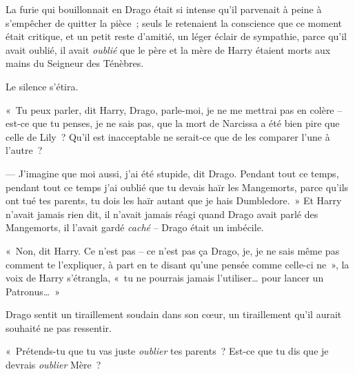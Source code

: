 \later

La furie qui bouillonnait en Drago était si intense qu'il parvenait à peine à s'empêcher de quitter la pièce~; seuls le retenaient la conscience que ce moment était critique, et un petit reste d'amitié, un léger éclair de sympathie, parce qu'il avait oublié, il avait \emph{oublié} que le père et la mère de Harry étaient morts aux mains du Seigneur des Ténèbres.

Le silence s'étira.

«~Tu peux parler, dit Harry, Drago, parle-moi, je ne me mettrai pas en colère -- est-ce que tu penses, je ne sais pas, que la mort de Narcissa a été bien pire que celle de Lily~? Qu'il est inacceptable ne serait-ce que de les comparer l'une à l'autre~?

--- J'imagine que moi aussi, j'ai été stupide, dit Drago. Pendant tout ce temps, pendant tout ce temps j'ai oublié que tu devais haïr les Mangemorts, parce qu'ils ont tué tes parents, tu dois les haïr autant que je hais Dumbledore.~» Et Harry n'avait jamais rien dit, il n'avait jamais réagi quand Drago avait parlé des Mangemorts, il l'avait gardé \emph{caché} -- Drago était un imbécile.

«~Non, dit Harry. Ce n'est pas -- ce n'est pas ça Drago, je, je ne sais même pas comment te l'expliquer, à part en te disant qu'une pensée comme celle-ci ne~», la voix de Harry s'étrangla, «~tu ne pourrais jamais l'utiliser… pour lancer un Patronus…~»

Drago sentit un tiraillement soudain dans son cœur, un tiraillement qu'il aurait souhaité ne pas ressentir.

«~Prétends-tu que tu vas juste \emph{oublier} tes parents~? Est-ce que tu dis que je devrais \emph{oublier} Mère~?

